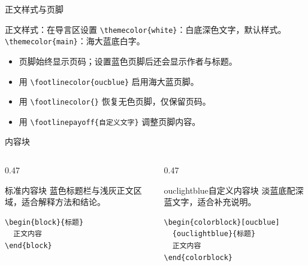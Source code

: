 \documentclass{beamer}
\begin{document}
\begin{frame}[fragile]{正文样式与页脚}
\begin{block}{正文样式：在导言区设置}
\verb|\themecolor{white}|：白底深色文字，默认样式。\\
\verb|\themecolor{main}|：海大蓝底白字。
\end{block}
\begin{itemize}
  \item 页脚始终显示页码；设置蓝色页脚后还会显示作者与标题。
  \item 用 \verb|\footlinecolor{oucblue}| 启用海大蓝页脚。
  \item 用 \verb|\footlinecolor{}| 恢复无色页脚，仅保留页码。
  \item 用 \verb|\footlinepayoff{自定义文字}| 调整页脚内容。
\end{itemize}
\end{frame}

\begin{frame}[fragile]{内容块}
\begin{columns}[T]
\begin{column}{0.47\textwidth}
\begin{block}{标准内容块}
蓝色标题栏与浅灰正文区域，适合解释方法和结论。
\end{block}
\begin{verbatim}
\begin{block}{标题}
  正文内容
\end{block}
\end{verbatim}
\end{column}
\begin{column}{0.47\textwidth}
\begin{colorblock}[oucblue]{ouclightblue}{自定义内容块}
淡蓝底配深蓝文字，适合补充说明。
\end{colorblock}
\begin{verbatim}
\begin{colorblock}[oucblue]
  {ouclightblue}{标题}
  正文内容
\end{colorblock}
\end{verbatim}
\end{column}
\end{columns}
\end{frame}
\end{document}

